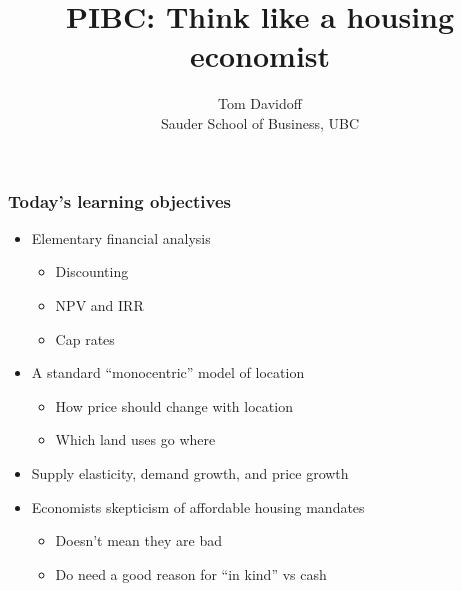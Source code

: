 \documentclass{beamer}
\begin{document}
\title{PIBC: Think like a housing economist}
\author{Tom Davidoff\\Sauder School of Business, UBC}
\frame{\titlepage}

\begin{frame}
	\frametitle{Today's learning objectives}
	\begin{itemize}
		\item Elementary financial analysis
			\begin{itemize}
				\item Discounting
				\item NPV and IRR
				\item Cap rates
			\end{itemize}
		\item A standard ``monocentric'' model of location
			\begin{itemize}
				\item How price should change with location
				\item Which land uses go where
			\end{itemize}
		\item Supply elasticity, demand growth, and price growth
		\item Economists skepticism of affordable housing mandates
			\begin{itemize}
				\item Doesn't mean they are bad
				\item Do need a good reason for ``in kind'' vs cash
			\end{itemize}
	\end{itemize}
\end{frame}
\end{document}
